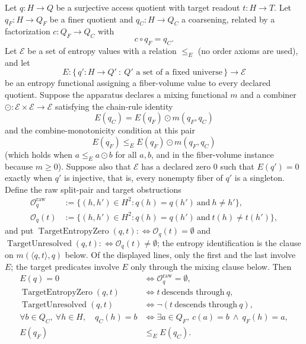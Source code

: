 \begin{theorem}\label{thm:F39}
Let \(q:H\to Q\) be a surjective access quotient with target readout
\(t:H\to T\).  Let \(q_F:H\to Q_F\) be a finer quotient and
\(q_C:H\to Q_C\) a coarsening, related by a factorization
\(c:Q_F\to Q_C\) with
\[
  c\circ q_F=q_C.
\]
Let \(\mathcal E\) be a set of entropy values with a relation \(\le_E\) (no order axioms are used), and let
\[
  E:\{\,q':H\to Q'\ :\ Q'\text{ a set of a fixed universe}\,\}\longrightarrow \mathcal E
\]
be an entropy functional assigning a fiber-volume value to every
declared quotient.  Suppose the apparatus declares a mixing
functional \(m\) and a combiner
\(\odot:\mathcal E\times\mathcal E\to\mathcal E\) satisfying the
chain-rule identity
\[
  E(q_C)=E(q_F)\odot m(q_F,q_C)
\]
and the combine-monotonicity condition at this pair
\[
  E(q_F)\le_E E(q_F)\odot m(q_F,q_C)
\]
(which holds when \(a\le_E a\odot b\) for all \(a,b\), and in the fiber-volume
instance because \(m\ge0\)).
Suppose also that \(\mathcal E\) has a declared zero \(0\) such that
\(E(q')=0\) exactly when \(q'\) is injective, that is, every nonempty fiber of \(q'\) is a singleton.
Define the raw split-pair and target obstructions
\begin{align*}
  \mathcal O_q^{\mathrm{raw}}
  &:=
  \{(h,h')\in H^2:q(h)=q(h')\ \text{and}\ h\ne h'\},\\
  \mathcal O_q(t)
  &:=
  \{(h,h')\in H^2:q(h)=q(h')\ \text{and}\ t(h)\ne t(h')\},
\end{align*}
and put \(\operatorname{TargetEntropyZero}(q,t):\Longleftrightarrow\mathcal O_q(t)=\emptyset\)
and \(\operatorname{TargetUnresolved}(q,t):\Longleftrightarrow\mathcal O_q(t)\neq\emptyset\);
the entropy identification is the clause on \(m(\langle q,t\rangle,q)\) below.
Of the displayed lines, only the first and the last involve \(E\); the target predicates involve \(E\) only through the mixing clause below.
Then
\begin{align*}
  E(q)=0
  &\iff
  \mathcal O_q^{\mathrm{raw}}=\emptyset,\\
  \operatorname{TargetEntropyZero}(q,t)
  &\iff
  t\ \text{descends through}\ q,\\
  \operatorname{TargetUnresolved}(q,t)
  &\iff
  \neg(t\ \text{descends through}\ q),\\
  \forall b\in Q_C,\ \forall h\in H,\quad
  q_C(h)=b
  &\iff
  \exists a\in Q_F,\ c(a)=b\ \wedge\ q_F(h)=a,\\
  E(q_F)
  &\le_E
  E(q_C).
\end{align*}

\end{theorem}
